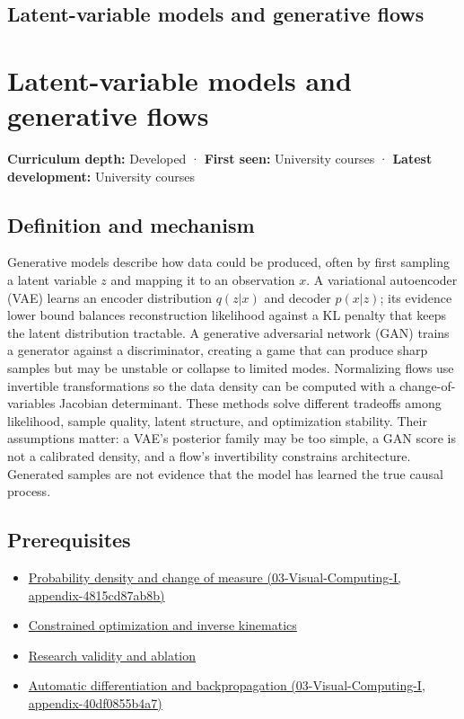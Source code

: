 \hypertarget{appendix-2c568f05ee34}{}
\section*{Latent-variable models and generative flows}
\chapter{Latent-variable models and generative flows}\label{appendix-2c568f05ee34-latent-variable-models-and-generative-flows}

\textbf{Curriculum depth:} Developed · \textbf{First seen:} University courses · \textbf{Latest development:} University courses

\section{Definition and mechanism}\label{appendix-2c568f05ee34-definition-and-mechanism}

Generative models describe how data could be produced, often by first sampling a latent variable \(z\) and mapping it to an observation \(x\). A variational autoencoder (VAE) learns an encoder distribution \(q(z|x)\) and decoder \(p(x|z)\); its evidence lower bound balances reconstruction likelihood against a KL penalty that keeps the latent distribution tractable. A generative adversarial network (GAN) trains a generator against a discriminator, creating a game that can produce sharp samples but may be unstable or collapse to limited modes. Normalizing flows use invertible transformations so the data density can be computed with a change-of-variables Jacobian determinant. These methods solve different tradeoffs among likelihood, sample quality, latent structure, and optimization stability. Their assumptions matter: a VAE's posterior family may be too simple, a GAN score is not a calibrated density, and a flow's invertibility constrains architecture. Generated samples are not evidence that the model has learned the true causal process.

\section{Prerequisites}\label{appendix-2c568f05ee34-prerequisites}

\begin{itemize}
\tightlist
\item
  \href{../03-Visual-Computing-I/main.pdf\#nameddest=appendix-4815cd87ab8b}{Probability density and change of measure (03-Visual-Computing-I, appendix-4815cd87ab8b)}
\item
  \hyperref[appendix-29f4bea4c2bb]{Constrained optimization and inverse kinematics}
\item
  \hyperref[appendix-65788587ef78]{Research validity and ablation}
\item
  \href{../03-Visual-Computing-I/main.pdf\#nameddest=appendix-40df0855b4a7}{Automatic differentiation and backpropagation (03-Visual-Computing-I, appendix-40df0855b4a7)}
\end{itemize}

